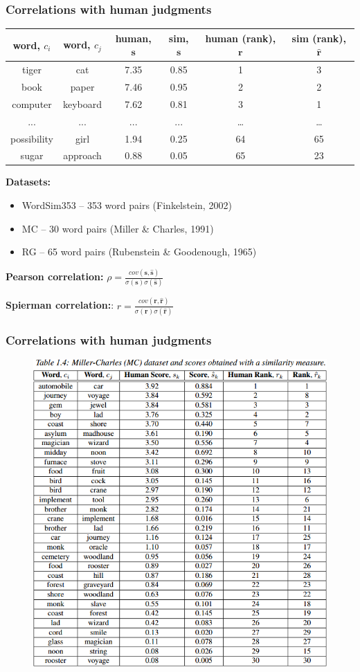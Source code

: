 \begin{frame}
\frametitle{Correlations with human judgments}

\begin{table}[h]\footnotesize
\begin{tabular}{ |c|c|c|c|c|c| }
\hline
  word, $c_i$ & word, $c_j$ & human, $\mathbf{s}$  & sim, $\mathbf{s}$  & human (rank), $\mathbf{r}$ & sim (rank), $\hat{\mathbf{r}}$  \\ \hline \hline
tiger & cat & 7.35 & 0.85 & 1 & 3 \\
book & paper & 7.46 &  0.95 & 2 & 2 \\
computer & keyboard & 7.62 &  0.81 & 3 & 1 \\
... & ... & ... & ...   & \ldots & \ldots \\
possibility & girl & 1.94 & 0.25 & 64 & 65 \\
sugar & approach & 0.88 & 0.05 & 65 & 23 \\ \hline
\end{tabular}
\end{table}


\textbf{Datasets:}

\begin{itemize}
    \item WordSim353 -- 353 word pairs (Finkelstein, 2002)  
    \item MC -- 30 word pairs  (Miller & Charles, 1991)
    \item RG -- 65 word pairs (Rubenstein & Goodenough, 1965)  
\end{itemize}

\textbf{Pearson correlation:}  $\rho = \frac{cov(\mathbf{s},\hat{\mathbf{s}})}{\sigma(\mathbf{s}) \sigma(\hat{\mathbf{s}})}$

 \textbf{Spierman correlation:}: $r = \frac{cov(\mathbf{r},\hat{\mathbf{r}})}{\sigma(\mathbf{r}) \sigma(\hat{\mathbf{r}})}$
\end{frame}


\begin{frame}
\frametitle{Correlations with human judgments}

\begin{figure}
\includegraphics[height=0.6\textwidth]{./figures/rg}
\end{figure}


\end{frame}





